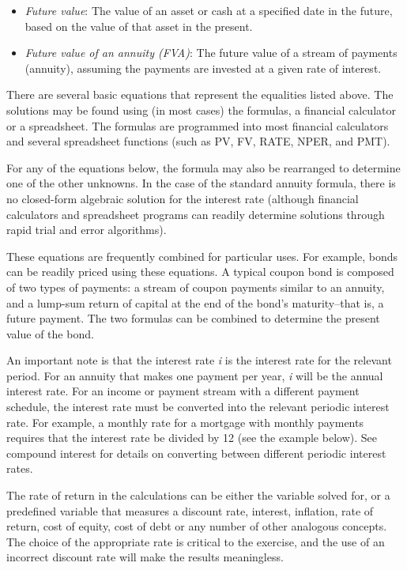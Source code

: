 \begin{itemize}
    \item \textit{Future value}: The value of an asset or cash at a specified date in the future, based on the value of that asset in the present.
    \item \textit{Future value of an annuity (FVA)}: The future value of a stream of payments (annuity), assuming the payments are invested at a given rate of interest.
\end{itemize}

There are several basic equations that represent the equalities listed above. The
solutions may be found using (in most cases) the formulas, a financial calculator or a
spreadsheet. The formulas are programmed into most financial calculators and several
spreadsheet functions (such as PV, FV, RATE, NPER, and PMT).



For any of the equations below, the formula may also be rearranged to determine one of the
other unknowns. In the case of the standard annuity formula, there is no closed-form
algebraic solution for the interest rate (although financial calculators and spreadsheet
programs can readily determine solutions through rapid trial and error algorithms).



These equations are frequently combined for particular uses. For example, bonds can be
readily priced using these equations. A typical coupon bond is composed of two types of
payments: a stream of coupon payments similar to an annuity, and a lump-sum return of
capital at the end of the bond's maturity--that is, a future payment. The two formulas can
be combined to determine the present value of the bond.



An important note is that the interest rate \textit{i} is the interest rate for the
relevant period. For an annuity that makes one payment per year, \textit{i} will be the
annual interest rate. For an income or payment stream with a different payment schedule,
the interest rate must be converted into the relevant periodic interest rate. For example,
a monthly rate for a mortgage with monthly payments requires that the interest rate be
divided by 12 (see the example below). See compound interest for details on converting
between different periodic interest rates.



The rate of return in the calculations can be either the variable solved for, or a
predefined variable that measures a discount rate, interest, inflation, rate of return,
cost of equity, cost of debt or any number of other analogous concepts. The choice of the
appropriate rate is critical to the exercise, and the use of an incorrect discount rate
will make the results meaningless.



